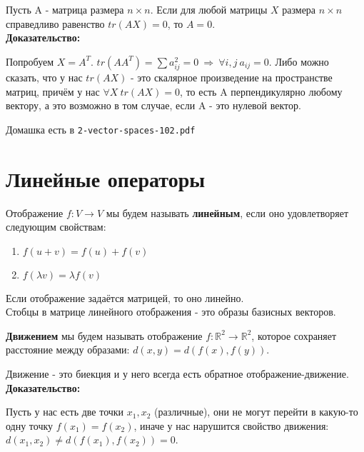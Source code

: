\documentclass[12pt]{article}
\newcommand{\R}{\mathbb{R}}
\begin{document}
\begin{theorembox}
    Пусть A - матрица размера $n \times n$. Если для любой матрицы $X$ размера $n \times n$ справедливо равенство $tr(AX) = 0$, то $A = 0$.\\

    \textbf{Доказательство:}

    Попробуем $X = A^T$. $tr(AA^T) = \sum a_{ij}^2 = 0 \ \Rightarrow \ \forall i, j \ a_{ij} = 0$. Либо можно сказать, что у нас $tr(AX)$ - это скалярное произведение на пространстве матриц, причём у нас $\forall X \ tr(AX) = 0$, то есть A перпендикулярно любому вектору, а это возможно в том случае, если A - это нулевой вектор.
\end{theorembox}

\begin{homeworkbox}
    Домашка есть в \texttt{2-vector-spaces-102.pdf}
\end{homeworkbox}

\section{Линейные операторы}

\begin{definitionbox}
    Отображение $f: V \rightarrow V$ мы будем называть \textbf{линейным}, если оно удовлетворяет следующим свойствам:
    \begin{enumerate}
        \item $f(u + v) = f(u) + f(v)$
        \item $f(\lambda v) = \lambda f(v)$
    \end{enumerate}
\end{definitionbox}

\begin{remarkbox}
    Если отображение задаётся матрицей, то оно линейно. \\
    Стобцы в матрице линейного отображения - это образы базисных векторов.
\end{remarkbox}

\begin{definitionbox}
    \textbf{Движением} мы будем называть отображение $f: \R^2 \rightarrow \R^2$, которое сохраняет расстояние между образами: $d(x, y) = d(f(x), f(y))$.
\end{definitionbox}

\begin{theorembox}
    Движение - это биекция и у него всегда есть обратное отображение-движение.\\

    \textbf{Доказательство:}

    Пусть у нас есть две точки $x_1, x_2$ (различные), они не могут перейти в какую-то одну точку $f(x_1) = f(x_2)$, иначе у нас нарушится свойство движения: $d(x_1, x_2) \neq d(f(x_1), f(x_2)) = 0$.
\end{theorembox}
\end{document}
